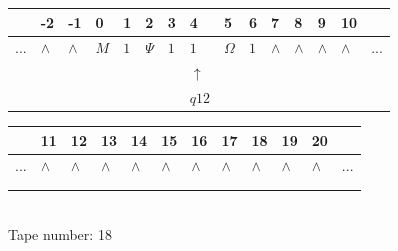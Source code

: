 \documentclass[11pt]{article}
\begin{document}
\begin{table}[H]
\centering
\begin{tabular}{lllllllllllllll}
 & -2 & -1 & 0 & 1 & 2 & 3 & 4 & 5 & 6 & 7 & 8 & 9 & 10 & \\
\hline
$...$ & \multicolumn{1}{|l|}{$\wedge$} & \multicolumn{1}{|l|}{$\wedge$} & \multicolumn{1}{|l|}{$M$} & \multicolumn{1}{|l|}{$1$} & \multicolumn{1}{|l|}{$\Psi$} & \multicolumn{1}{|l|}{$1$} & \multicolumn{1}{|l|}{$1$} & \multicolumn{1}{|l|}{$\Omega$} & \multicolumn{1}{|l|}{$1$} & \multicolumn{1}{|l|}{$\wedge$} & \multicolumn{1}{|l|}{$\wedge$} & \multicolumn{1}{|l|}{$\wedge$} & \multicolumn{1}{|l|}{$\wedge$} & $...$\\
\hline
&  &  &  &  &  &  & $\uparrow$ &  &  &  &  &  &  &  \\
&  &  &  &  &  &  & $ q12 $ &  &  &  &  &  &  &  \\
\end{tabular}
\begin{tabular}{llllllllllll}
 & 11 & 12 & 13 & 14 & 15 & 16 & 17 & 18 & 19 & 20 & \\
\hline
$...$ & \multicolumn{1}{|l|}{$\wedge$} & \multicolumn{1}{|l|}{$\wedge$} & \multicolumn{1}{|l|}{$\wedge$} & \multicolumn{1}{|l|}{$\wedge$} & \multicolumn{1}{|l|}{$\wedge$} & \multicolumn{1}{|l|}{$\wedge$} & \multicolumn{1}{|l|}{$\wedge$} & \multicolumn{1}{|l|}{$\wedge$} & \multicolumn{1}{|l|}{$\wedge$} & \multicolumn{1}{|l|}{$\wedge$} & $...$\\
\hline
&  &  &  &  &  &  &  &  &  &  &  \\
&  &  &  &  &  &  &  &  &  &  &  \\
\end{tabular}
\\
Tape number: 18
\noindent\makebox[\linewidth]{\hdashrule{\textwidth}{1pt}{1pt}}\end{table}
\end{document}
